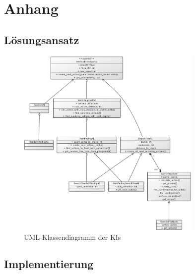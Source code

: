 \chapter{Anhang}
\label{ch:anhang}

\section{Lösungsansatz}
\label{sec:anhang-loesungsansatz}

\begin{figure}[htb]
	\centering
	\includegraphics[width=0.8\textwidth]{Bilder/Klassendiagramm_AIs.png}
	\caption{UML-Klassendiagramm der \ac{KI}s}
	\label{fig:klassendiagramm-AIs}
\end{figure}
\clearpage

\section{Implementierung}
\label{sec:anhang-implementierung}

